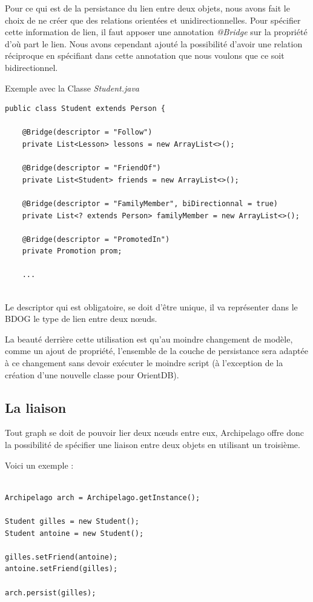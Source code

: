 \documentclass[a4paper,fleqn,12pt]{report}
\begin{document}
Pour ce qui est de la persistance du lien entre deux objets, nous avons fait le choix de ne créer que des relations orientées et unidirectionnelles. Pour spécifier cette information de lien, il faut apposer une annotation \textit{@Bridge} sur la propriété d'où part le lien. Nous avons cependant ajouté la possibilité d'avoir une relation réciproque en spécifiant dans cette annotation que nous voulons que ce soit bidirectionnel. 

Exemple avec la Classe \textit{Student.java}

\begin{lstlisting}
public class Student extends Person {

    @Bridge(descriptor = "Follow")
    private List<Lesson> lessons = new ArrayList<>();
    
    @Bridge(descriptor = "FriendOf")
    private List<Student> friends = new ArrayList<>();
    
    @Bridge(descriptor = "FamilyMember", biDirectionnal = true)
    private List<? extends Person> familyMember = new ArrayList<>();
    
    @Bridge(descriptor = "PromotedIn")
    private Promotion prom;
    
    ...
    
\end{lstlisting}

Le descriptor qui est obligatoire, se doit d'être unique, il va représenter dans le BDOG le type de lien entre deux nœuds.

La beauté derrière cette utilisation est qu'au moindre changement de modèle, comme un ajout de propriété, l'ensemble de la couche de persistance sera adaptée à ce changement sans devoir exécuter le moindre script (à l'exception de la création d'une nouvelle classe pour OrientDB).

\subsection{La liaison}

Tout graph se doit de pouvoir lier deux nœuds entre eux, Archipelago offre donc la possibilité de spécifier une liaison entre deux objets en utilisant un troisième. 

Voici un exemple : 

\begin{lstlisting}

Archipelago arch = Archipelago.getInstance();

Student gilles = new Student();
Student antoine = new Student();

gilles.setFriend(antoine);
antoine.setFriend(gilles);

arch.persist(gilles);

\end{lstlisting}
\end{document}
